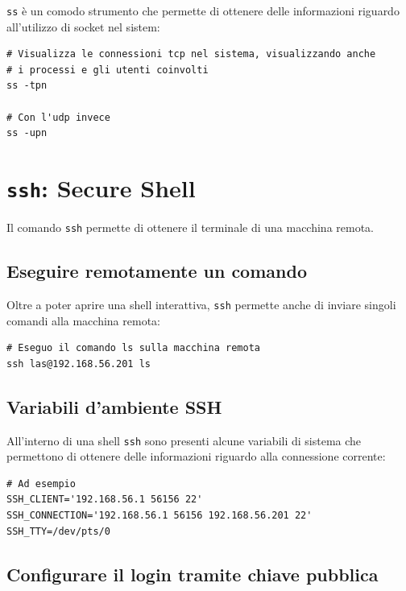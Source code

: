 \documentclass[a4paper]{report}
\newenvironment{code}{\begin{tcolorbox}[size=small]}{\end{tcolorbox}}
\begin{document}
\texttt{ss} è un comodo strumento che permette di ottenere delle informazioni riguardo all'utilizzo di socket nel sistem:

 \begin{code}
\begin{lstlisting}
# Visualizza le connessioni tcp nel sistema, visualizzando anche
# i processi e gli utenti coinvolti
ss -tpn

# Con l'udp invece
ss -upn
\end{lstlisting}
 \end{code}

\chapter{\texttt{ssh}: Secure Shell}

Il comando \texttt{ssh} permette di ottenere il terminale di una macchina remota.

\section{Eseguire remotamente un comando}

Oltre a poter aprire una shell interattiva, \texttt{ssh} permette anche di inviare singoli comandi alla macchina remota:
\begin{code}
\begin{lstlisting}
# Eseguo il comando ls sulla macchina remota
ssh las@192.168.56.201 ls
\end{lstlisting}
\end{code}

\section{Variabili d'ambiente SSH}

All'interno di una shell \texttt{ssh} sono presenti alcune variabili di sistema che permettono di ottenere delle informazioni riguardo alla connessione corrente:

\begin{code}
\begin{lstlisting}
# Ad esempio
SSH_CLIENT='192.168.56.1 56156 22'
SSH_CONNECTION='192.168.56.1 56156 192.168.56.201 22'
SSH_TTY=/dev/pts/0
\end{lstlisting}
\end{code}

\section{Configurare il login tramite chiave pubblica}
\end{document}
